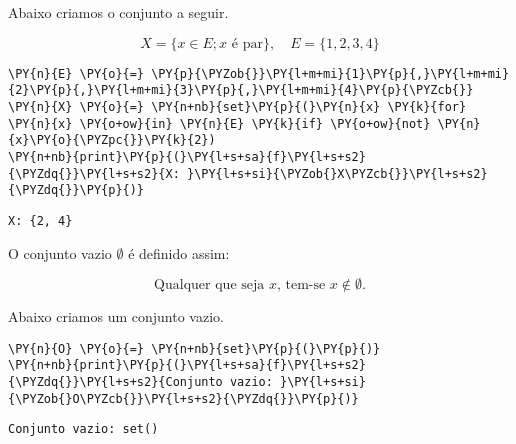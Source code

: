 \documentclass{book}
\begin{document}
        \begin{exemplo}
            Abaixo criamos o conjunto a seguir.

            $$X = \{x \in E; x \text{ é par} \}, \quad E = \{1,2,3,4\}$$



\begin{Verbatim}[commandchars=\\\{\},frame=single,fontsize=\small, xleftmargin=0.5em]
\PY{n}{E} \PY{o}{=} \PY{p}{\PYZob{}}\PY{l+m+mi}{1}\PY{p}{,}\PY{l+m+mi}{2}\PY{p}{,}\PY{l+m+mi}{3}\PY{p}{,}\PY{l+m+mi}{4}\PY{p}{\PYZcb{}}
\PY{n}{X} \PY{o}{=} \PY{n+nb}{set}\PY{p}{(}\PY{n}{x} \PY{k}{for} \PY{n}{x} \PY{o+ow}{in} \PY{n}{E} \PY{k}{if} \PY{o+ow}{not} \PY{n}{x}\PY{o}{\PYZpc{}}\PY{k}{2})
\PY{n+nb}{print}\PY{p}{(}\PY{l+s+sa}{f}\PY{l+s+s2}{\PYZdq{}}\PY{l+s+s2}{X: }\PY{l+s+si}{\PYZob{}X\PYZcb{}}\PY{l+s+s2}{\PYZdq{}}\PY{p}{)}
\end{Verbatim}

\begin{Verbatim}[commandchars=\\\{\},frame=leftline,fontsize=\small, xleftmargin=0.5em]
X: {2, 4}
\end{Verbatim}

        \end{exemplo}

        O conjunto vazio $\emptyset$ é definido assim:

        $$\text{Qualquer que seja } x\text{, tem-se }x \notin \emptyset \text{.}$$

        \begin{exemplo}
            Abaixo criamos um conjunto vazio.



\begin{Verbatim}[commandchars=\\\{\},frame=single,fontsize=\small, xleftmargin=0.5em]
\PY{n}{O} \PY{o}{=} \PY{n+nb}{set}\PY{p}{(}\PY{p}{)}
\PY{n+nb}{print}\PY{p}{(}\PY{l+s+sa}{f}\PY{l+s+s2}{\PYZdq{}}\PY{l+s+s2}{Conjunto vazio: }\PY{l+s+si}{\PYZob{}O\PYZcb{}}\PY{l+s+s2}{\PYZdq{}}\PY{p}{)}
\end{Verbatim}

\begin{Verbatim}[commandchars=\\\{\},frame=leftline,fontsize=\small, xleftmargin=0.5em]
Conjunto vazio: set()
\end{Verbatim}

        \end{exemplo}
\end{document}

